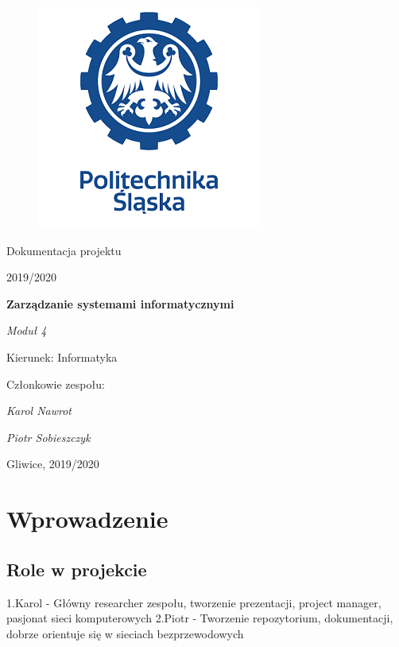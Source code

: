 \documentclass[12pt,a4paper]{article}
\begin{document}
\clearpage
\begin{figure}[h]
\centering
\includegraphics{media/ps-logo.png}
\end{figure}
\hspace{3cm}
\begin{center}Dokumentacja projektu\end{center}
\begin{center}2019/2020\end{center}
\hspace{3cm}
\begin{center}\large\textbf{Zarządzanie systemami informatycznymi}\end{center}
\begin{center}\large\textit{Moduł 4}\end{center}

\hspace{7cm}
\begin{flushright}Kierunek: Informatyka
\end{flushright}
\begin{flushright}Członkowie zespołu:
\par
\textit{Karol Nawrot}
\par
\textit{Piotr Sobieszczyk}
\end{flushright}
\vfill
\begin{center}Gliwice, 2019/2020\end{center}

\newpage
{}
\tableofcontents

\newpage
\section{Wprowadzenie}

\subsection{Role w projekcie}
1.Karol - Główny researcher zespołu, tworzenie prezentacji, project manager, pasjonat sieci komputerowych \newline
2.Piotr - Tworzenie repozytorium, dokumentacji, dobrze orientuje się w sieciach bezprzewodowych
\end{document}
